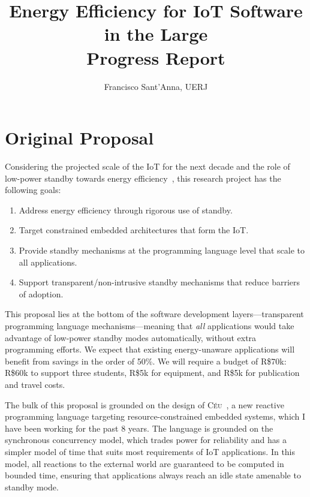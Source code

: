 \documentclass[12pt,english]{amsart}
\title{Energy Efficiency for IoT Software in the Large \\ Progress Report}
\author{Francisco Sant'Anna, UERJ}
\newcommand{\CEU}{\textsc{C\'{e}u}\xspace}
\begin{document}
\maketitle

\vspace{-0.5cm}

\section{Original Proposal}

Considering the projected scale of the IoT for the next decade and the role of
low-power standby towards energy efficiency~\cite{iea.data}, this research
project has the following goals:

\begin{enumerate}
    \item Address energy efficiency through rigorous use of standby.
    \item Target constrained embedded architectures that form the IoT.
    \item Provide standby mechanisms at the programming language level that
          scale to all applications.
    \item Support transparent/non-intrusive standby mechanisms that reduce
          barriers of adoption.
\end{enumerate}

This proposal lies at the bottom of the software development
layers---transparent programming language mechanisms---meaning that \emph{all}
applications would take advantage of low-power standby modes automatically,
without extra programming efforts.
%
We expect that existing energy-unaware applications will benefit from savings
in the order of 50\%.
%
We will require a budget of R\$70k:
R\$60k to support three students, R\$5k for equipment, and
R\$5k for publication and travel costs.

The bulk of this proposal is grounded on the design of \CEU~\cite{ceu.tecs17},
a new reactive programming language targeting resource-constrained embedded
systems, which I have been working for the past 8 years.
%
The language is grounded on the synchronous concurrency model, which trades
power for reliability and has a simpler model of time that suits most
requirements of IoT applications.
%
In this model, all reactions to the external world are guaranteed to be
computed in bounded time, ensuring that applications always reach an idle state
amenable to standby mode.
\end{document}
